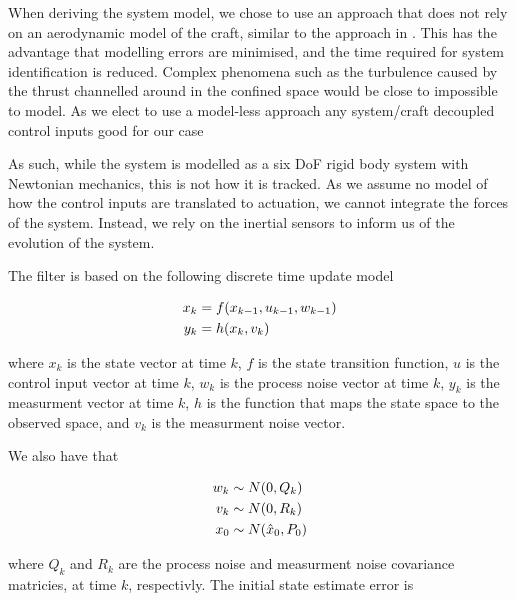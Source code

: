 \documentclass[]{article}
\begin{document}
{%

When deriving the system model, we chose to use an approach that does not rely on an aerodynamic model of the craft, similar to the approach in \cite{OpenPilotPaper}.
This has the advantage that modelling errors are minimised, and the time required for system identification is reduced.
Complex phenomena such as the turbulence caused by the thrust channelled around in the confined space would be close to impossible to model.
As we elect to use a model-less approach
	any system/craft
	decoupled control inputs
	good for our case

As such, while the system is modelled as a six \ac{DoF} rigid body system with Newtonian mechanics, this is not how it is tracked.
As we assume no model of how the control inputs are translated to actuation, we cannot integrate the forces of the system. Instead, we rely on the inertial sensors to inform us of the evolution of the system.



The filter is based on the following discrete time update model

\begin{align}
	x_k &= f(x_{k-1}, u_{k-1}, w_{k-1}) \notag \\
	y_k &= h(x_k, v_k)
	\label{eqn:system}
\end{align}

where $x_k$ is the state vector at time $k$, $f$ is the state transition function, $u$ is the control input vector at time $k$, $w_k$ is the process noise vector at time $k$, $y_k$ is the measurment vector at time $k$, $h$ is the function that maps the state space to the observed space, and $v_k$ is the measurment noise vector.

We also have that

\begin{align}
	w_k &\sim N(0,Q_k) \notag \\
	v_k &\sim N(0,R_k) \notag \\
	x_0 &\sim N(\hat{x}_0,P_0)
\end{align}

where $Q_k$ and $R_k$ are the process noise and measurment noise covariance matricies, at time $k$, respectivly. The initial state estimate error is 



}
\end{document}
